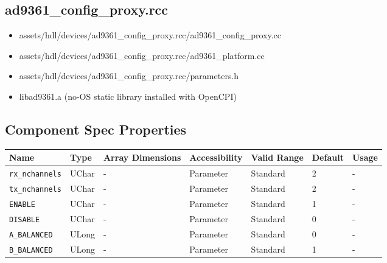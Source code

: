 \documentclass{article}
\def\comp{ad9361\_config\_proxy}
\begin{document}
\subsection*{\comp.rcc}
\begin{itemize}
	\item assets/hdl/devices/\comp{}.rcc/\comp{}.cc
	\item assets/hdl/devices/\comp{}.rcc/ad9361\_platform.cc
	\item assets/hdl/devices/\comp{}.rcc/parameters.h
	\item libad9361.a (no-OS static library installed with OpenCPI)
\end{itemize}
\begin{landscape}

	\section*{Component Spec Properties}
	\begin{scriptsize}
		\begin{longtable}{|p{3.6cm}|p{8.1cm}|p{1.4cm}|p{1.3cm}|p{1.4cm}|p{2.5cm}|p{3.6cm}|}
			\hline
			\rowcolor{blue}
			Name               & Type & Array Dimensions & Accessibility      & Valid Range & Default & Usage                                                                               \\
			\hline
      \verb+rx_nchannels+              & UChar        & -               & Parameter             & Standard                         & 2                   & - \\
			\hline
      \verb+tx_nchannels+              & UChar        & -               & Parameter             & Standard                         & 2                   & - \\
			\hline
      \verb+ENABLE+                    & UChar        & -               & Parameter             & Standard                         & 1                   & - \\
			\hline
      \verb+DISABLE+                   & UChar        & -               & Parameter             & Standard                         & 0                   & - \\
			\hline
      \verb+A_BALANCED+                & ULong        & -               & Parameter             & Standard                         & 0                   & - \\
			\hline
      \verb+B_BALANCED+                & ULong        & -               & Parameter             & Standard                         & 1                   & - \\

\end{longtable}
\end{scriptsize}
\end{landscape}
\end{document}
